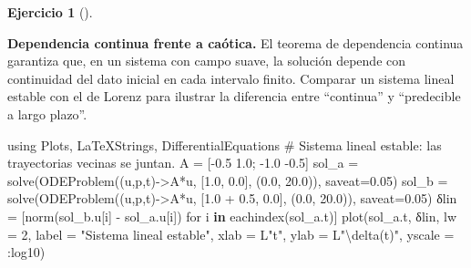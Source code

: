 \documentclass[
  spanish,
  a4paper,
]{scrreport}
\newenvironment{Shaded}{\begin{snugshade}}{\end{snugshade}}
\newcommand{\BuiltInTok}[1]{\textcolor[rgb]{0.00,0.23,0.31}{#1}}
\newcommand{\CommentTok}[1]{\textcolor[rgb]{0.37,0.37,0.37}{#1}}
\newcommand{\FloatTok}[1]{\textcolor[rgb]{0.68,0.00,0.00}{#1}}
\newcommand{\FunctionTok}[1]{\textcolor[rgb]{0.28,0.35,0.67}{#1}}
\newcommand{\ImportTok}[1]{\textcolor[rgb]{0.00,0.46,0.62}{#1}}
\newcommand{\KeywordTok}[1]{\textcolor[rgb]{0.00,0.23,0.31}{\textbf{#1}}}
\newcommand{\NormalTok}[1]{\textcolor[rgb]{0.00,0.23,0.31}{#1}}
\newcommand{\OperatorTok}[1]{\textcolor[rgb]{0.37,0.37,0.37}{#1}}
\newcommand{\StringTok}[1]{\textcolor[rgb]{0.13,0.47,0.30}{#1}}
\theoremstyle{definition}
\newtheorem{exercise}{Ejercicio}[chapter]
\theoremstyle{remark}
\begin{document}
\begin{exercise}[]\protect\hypertarget{exr-dependencia-datos-edo}{}\label{exr-dependencia-datos-edo}

\textbf{Dependencia continua frente a caótica.} El teorema de
dependencia continua garantiza que, en un sistema con campo suave, la
solución depende con continuidad del dato inicial en cada intervalo
finito. Comparar un sistema lineal estable con el de Lorenz para
ilustrar la diferencia entre ``continua'' y ``predecible a largo
plazo''.

\begin{tcolorbox}[enhanced jigsaw, arc=.35mm, bottomrule=.15mm, bottomtitle=1mm, breakable, colback=white, colbacktitle=quarto-callout-tip-color!10!white, colframe=quarto-callout-tip-color-frame, coltitle=black, left=2mm, leftrule=.75mm, opacityback=0, opacitybacktitle=0.6, rightrule=.15mm, title=\textcolor{quarto-callout-tip-color}{\faLightbulb}\hspace{0.5em}{Solución}, titlerule=0mm, toprule=.15mm, toptitle=1mm]

\begin{Shaded}
\begin{Highlighting}[]
\ImportTok{using} \BuiltInTok{Plots}\NormalTok{, }\BuiltInTok{LaTeXStrings}\NormalTok{, }\BuiltInTok{DifferentialEquations}
\CommentTok{\# Sistema lineal estable: las trayectorias vecinas se juntan.}
\NormalTok{A }\OperatorTok{=}\NormalTok{ [}\OperatorTok{{-}}\FloatTok{0.5} \FloatTok{1.0}\NormalTok{; }\OperatorTok{{-}}\FloatTok{1.0} \OperatorTok{{-}}\FloatTok{0.5}\NormalTok{]}
\NormalTok{sol\_a }\OperatorTok{=} \FunctionTok{solve}\NormalTok{(}\FunctionTok{ODEProblem}\NormalTok{((u,p,t)}\OperatorTok{{-}\textgreater{}}\NormalTok{A}\OperatorTok{*}\NormalTok{u, [}\FloatTok{1.0}\NormalTok{, }\FloatTok{0.0}\NormalTok{], (}\FloatTok{0.0}\NormalTok{, }\FloatTok{20.0}\NormalTok{)), saveat}\OperatorTok{=}\FloatTok{0.05}\NormalTok{)}
\NormalTok{sol\_b }\OperatorTok{=} \FunctionTok{solve}\NormalTok{(}\FunctionTok{ODEProblem}\NormalTok{((u,p,t)}\OperatorTok{{-}\textgreater{}}\NormalTok{A}\OperatorTok{*}\NormalTok{u, [}\FloatTok{1.0} \OperatorTok{+} \FloatTok{0.5}\NormalTok{, }\FloatTok{0.0}\NormalTok{], (}\FloatTok{0.0}\NormalTok{, }\FloatTok{20.0}\NormalTok{)), saveat}\OperatorTok{=}\FloatTok{0.05}\NormalTok{)}
\NormalTok{δlin }\OperatorTok{=}\NormalTok{ [}\FunctionTok{norm}\NormalTok{(sol\_b.u[i] }\OperatorTok{{-}}\NormalTok{ sol\_a.u[i]) for i }\KeywordTok{in} \FunctionTok{eachindex}\NormalTok{(sol\_a.t)]}
\FunctionTok{plot}\NormalTok{(sol\_a.t, δlin, lw }\OperatorTok{=} \FloatTok{2}\NormalTok{, label }\OperatorTok{=} \StringTok{"Sistema lineal estable"}\NormalTok{,}
\NormalTok{    xlab }\OperatorTok{=}\NormalTok{ L}\StringTok{"t"}\NormalTok{, ylab }\OperatorTok{=}\NormalTok{ L}\StringTok{"\textbackslash{}delta(t)"}\NormalTok{, yscale }\OperatorTok{=} \OperatorTok{:}\NormalTok{log10)}
\end{Highlighting}
\end{Shaded}


\end{tcolorbox}
\end{exercise}
\end{document}
